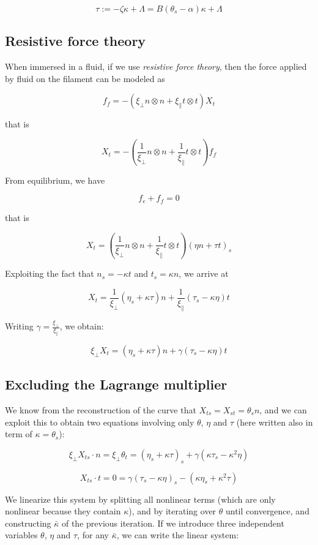 \documentclass[12pt]{article}
\begin{document}
\[\tau := -\zeta\kappa + \Lambda = B(\theta_s-\alpha)\kappa +\Lambda\]

\subsection{Resistive force theory}
\label{sec:resist-force-theory}



When immersed in a fluid, if we use \emph{resistive force theory},
then the force applied by fluid on the filament can be modeled as

\[f_f = -( \xi_\perp n\otimes n +\xi_\parallel t\otimes t) X_t\]

that is

\[X_t = -\left( \frac{1}{\xi_\perp}  n\otimes n + \frac{1}{\xi_\parallel} t\otimes t\right) f_f\]

From equilibrium, we have

\[f_e+f_f = 0\]

that is

\[X_t = \left( \frac{1}{\xi_\perp}  n\otimes n + \frac{1}{\xi_\parallel} t\otimes t\right) (\eta n + \tau t)_s\]

Exploiting the fact that \(n_s = - \kappa t\) and \(t_s = \kappa n\), we
arrive at

\[X_t =  \frac{1}{\xi_\perp} (\eta_s + \kappa \tau) n + \frac{1}{\xi_\parallel}(\tau_s - \kappa \eta) t\]

Writing $\gamma = \frac{\xi_\perp}{\xi_\parallel}$, we obtain:

\[\xi_\perp X_t =   (\eta_s + \kappa \tau) n + \gamma (\tau_s - \kappa \eta) t\]

\subsection{Excluding the Lagrange multiplier}\label{differential-derivation}

We know from the reconstruction of the curve that
\(X_{ts} = X_{st} = \theta_s n\),
and we can exploit this to obtain two equations involving only
\(\theta\),
\(\eta\)
and \(\tau\) (here written also in term of $\kappa = \theta_s$):

\[ \xi_\perp X_{ts}\cdot n =\xi_\perp \theta_t =   (\eta_s + \kappa \tau)_s + \gamma (\kappa \tau_s - \kappa^2 \eta)\]

\[X_{ts}\cdot t = 0 =  \gamma(\tau_s - \kappa \eta)_s - (\kappa \eta_s + \kappa^2 \tau) \]

We linearize this system by splitting all nonlinear terms (which are
only nonlinear because they contain \(\kappa\)), and by iterating over
\(\theta\) until convergence, and constructing \(\bar\kappa\) of the
previous iteration. If we introduce three independent variables
\(\theta\), \(\eta\) and \(\tau\), for any \(\bar\kappa\), we can write
the linear system:
\end{document}
